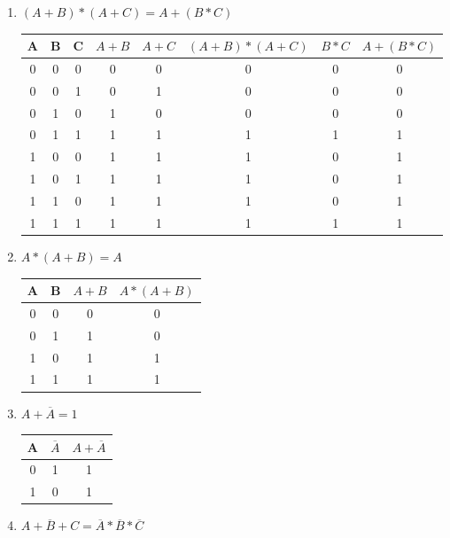 \begin{enumerate}
	\item $(A+B)*(A+C)=A+(B*C)$
	
	\begin{table}[H]
		\centering
		\begin{tabular}{|c|c|c|c|c|c|c|c|}
			\hline
			A & B & C & $A+B$ & $A+C$ & $(A+B)*(A+C)$ & $B*C$ & $A+(B*C)$ \\\hline
			0 & 0 & 0 & 0   & 0   & 0           & 0   & 0       \\\hline
			0 & 0 & 1 & 0   & 1   & 0           & 0   & 0       \\\hline
			0 & 1 & 0 & 1   & 0   & 0           & 0   & 0\\\hline
			0 & 1 & 1 & 1   & 1   & 1           & 1   & 1\\\hline
			1 & 0 & 0 & 1   & 1   & 1           & 0   & 1\\\hline
			1 & 0 & 1 & 1   & 1   & 1           & 0   & 1\\\hline
			1 & 1 & 0 & 1   & 1   & 1           & 0   & 1\\\hline
			1 & 1 & 1 & 1   & 1   & 1           & 1   & 1\\\hline
		\end{tabular}
	\end{table}
	\item $A*(A+B)=A$

	\begin{table}[H]
		\centering
		\begin{tabular}{|c|c|c|c|}
			\hline
			A & B & $A+B$ & $A*(A+B)$ \\\hline
			0 & 0 & 0   & 0       \\\hline
			0 & 1 & 1   & 0       \\\hline
			1 & 0 & 1   & 1       \\\hline
			1 & 1 & 1   & 1       \\\hline
		\end{tabular}
	\end{table}	
	\item $A+\overline{A}=1$
	
	\begin{table}[H]
		\centering
		\begin{tabular}{|c|c|c|}
			\hline
			A & $\overline{A}$ & $A+\overline{A}$ \\\hline
			0 & 1 		   & 1              \\\hline
			1 & 0 		   & 1              \\\hline
		\end{tabular}
	\end{table}	
	\item $\overline{A+B+C} = \overline{A}*\overline{B}*\overline{C}$
	

\end{enumerate}
